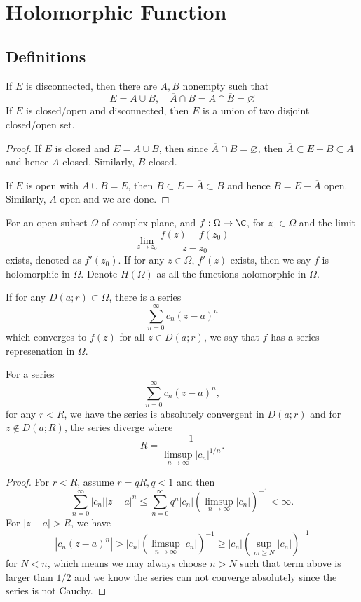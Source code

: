 \section{Holomorphic Function}

\subsection{Definitions}

\begin{definition}
    [Disconnection] If $E$ is disconnected, then there are $A,B$ nonempty such that
    \[
    E = A\cup B,\quad \overline{A} \cap B = A\cap \overline{B} = \varnothing
    \]
    If $E$ is closed/open and disconnected, then $E$ is a union of two disjoint closed/open set.
\end{definition}
\begin{proof}
    If $E$ is closed and $E = A \cup B$, then since $\overline{A} \cap B = \varnothing$, then $\overline{A} \subset E - B \subset A$ and hence $A$ closed. Similarly, $B$ closed.\par
    If $E$ is open with $A\cup B = E$, then $ B \subset E - \overline{A} \subset B$ and hence $B = E - \overline{A}$ open. Similarly, $A$ open and we are done.
\end{proof}

\begin{definition}
     For an open subset $\Omega$ of complex plane, and $f: \Omega \to \C$, for $z_0 \in \Omega$ and the limit
    \[
    \lim_{z\to z_0} \dfrac{f(z)-f(z_0)}{z-z_0}
    \]
    exists, denoted as $f'(z_0)$. If for any $z\in\Omega$, $f'(z)$ exists, then we say $f$ is holomorphic in $\Omega$. Denote $H(\Omega)$ as all the functions holomorphic in $\Omega$.
\end{definition}

\begin{definition}
    [Series] If for any $D(a;r) \subset \Omega$, there is a series
    \[
    \sum\limits_{n=0}^{\infty} c_n(z-a)^n
    \]
    which converges to $f(z)$ for all $z \in D(a;r)$, we say that $f$ has a series represenation in $\Omega$.
\end{definition}

\begin{theorem}
\label{thm: convergent-radius}
    For a series
    \[
    \sum\limits_{n=0}^{\infty} c_n(z-a)^n,
    \]
    for any $r < R$, we have the series is absolutely convergent in $\overline{D}(a;r)$ and for $z\notin \overline{D}(a;R)$, the series diverge where
    \[
    R = \dfrac{1}{\limsup_{n\to\infty} |c_n|^{1/n}}.
    \]
\end{theorem}
\begin{proof}
    For $r < R$, assume $r = q R, q < 1$ and then
    \[
    \sum\limits_{n=0}^{\infty} |c_n||z-a|^n \leq \sum\limits_{n = 0}^{\infty} q^n|c_n|(\limsup_{n\to\infty} |c_n|)^{-1} < \infty.
    \]
    For $|z-a| > R$, we have
    \[
    |c_n(z-a)^n| > |c_n|(\limsup_{n\to\infty} |c_n|)^{-1} \geq |c_n|(\sup_{m\geq N} |c_n|)^{-1}
    \]
    for $N < n$, which means we may always choose $n > N$ such that term above is larger than $1/2$ and we know the series can not converge absolutely since the series is not Cauchy.
\end{proof}

